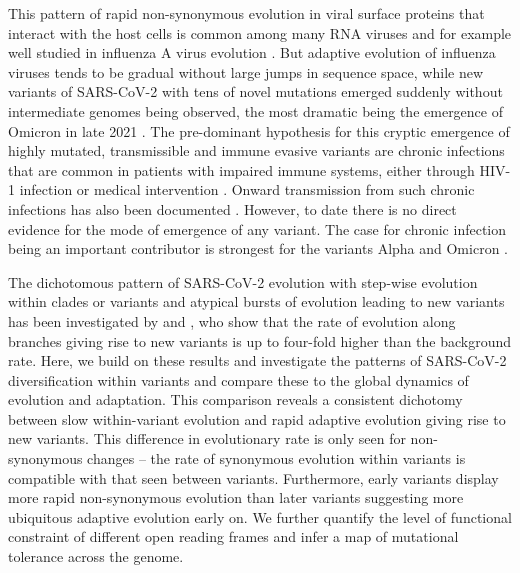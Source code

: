 \documentclass[aps,rmp, twocolumn]{revtex4}
\begin{document}
This pattern of rapid non-synonymous evolution in viral surface proteins that interact with the host cells is common among many RNA viruses and for example well studied in influenza A virus evolution \citep{bhatt_genomic_2011,strelkowa_clonal_2012}.
But adaptive evolution of influenza viruses tends to be gradual without large jumps in sequence space, while new variants of SARS-CoV-2 with tens of novel mutations emerged suddenly without intermediate genomes being observed, the most dramatic being the emergence of Omicron in late 2021 \citep{viana_rapid_2022}.
The pre-dominant hypothesis for this cryptic emergence of highly mutated, transmissible and immune evasive variants are chronic infections that are common in patients with impaired immune systems, either through HIV-1 infection \citep{cele_sars-cov-2_2022} or medical intervention \citep{choi_persistence_2020,kemp_sars-cov-2_2021}.
Onward transmission from such chronic infections has also been documented \citep{gonzalez-reiche_intrahost_2022}.
However, to date there is no direct evidence for the mode of emergence of any variant.
The case for chronic infection being an important contributor is strongest for the variants Alpha and Omicron \citep{hill_origins_2022}.

The dichotomous pattern of SARS-CoV-2 evolution with step-wise evolution within clades or variants and atypical bursts of evolution leading to new variants has been investigated by \citet{tay_emergence_2022} and \citet{hill_origins_2022}, who show that the rate of evolution along branches giving rise to new variants is up to four-fold higher than the background rate.
Here, we build on these results and investigate the patterns of SARS-CoV-2 diversification within variants and compare these to the global dynamics of evolution and adaptation.
This comparison reveals a consistent dichotomy between slow within-variant evolution and rapid adaptive evolution giving rise to new variants.
This difference in evolutionary rate is only seen for non-synonymous changes -- the rate of synonymous evolution within variants is compatible with that seen between variants.
Furthermore, early variants display more rapid non-synonymous evolution than later variants suggesting more ubiquitous adaptive evolution early on.
We further quantify the level of functional constraint of different open reading frames and infer a map of mutational tolerance across the genome.
\end{document}
